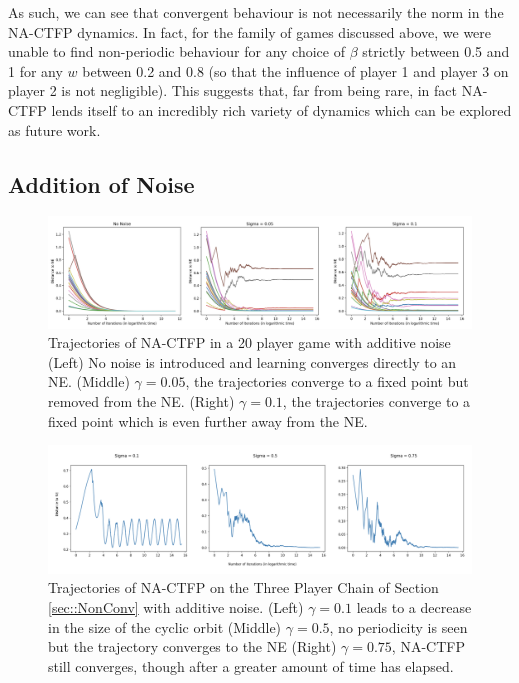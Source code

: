 \documentclass{article}
\theoremstyle{definition}
\begin{document}
  As such, we can see that convergent behaviour is not necessarily the norm in the NA-CTFP dynamics. In fact, for the family of games discussed above, we were unable to find non-periodic behaviour for any choice of $\beta$ strictly between 0.5 and 1 for any $w$ between 0.2 and 0.8 (so that the influence of player 1 and player 3 on player 2 is not negligible). This suggests that, far from being rare, in fact NA-CTFP lends itself to an incredibly rich variety of dynamics which can be explored as future work.
  

  \subsection{Addition of Noise}

  \begin{figure}[t]
    \centering
    \includegraphics[width = \columnwidth]{Figures/Noise20Player.png}
    \caption{\label{fig::Noise20Player} Trajectories of NA-CTFP in a 20 player game with additive noise (Left) No noise is introduced and learning converges directly to an NE. (Middle) $\gamma = 0.05$, the trajectories converge to a fixed point but removed from the NE. (Right) $\gamma = 0.1$, the trajectories converge to a fixed point which is even further away from the NE.}
  \end{figure}

  \begin{figure}[t]
    \centering
    \includegraphics[width = \columnwidth]{Figures/3PlayerChainNoise.png}
    \caption{\label{fig::3PlayerChainNoise} Trajectories of NA-CTFP on the Three Player Chain of Section \ref{sec::NonConv} with additive noise. (Left) $\gamma = 0.1$ leads to a decrease in the size of the cyclic orbit (Middle) $\gamma = 0.5$, no periodicity is seen but the trajectory converges to the NE (Right) $\gamma = 0.75$, NA-CTFP still converges, though after a greater amount of time has elapsed.}
  \end{figure}
\end{document}
